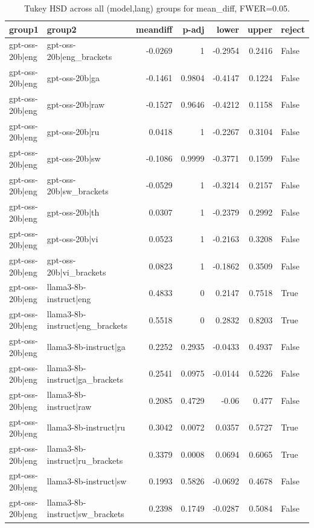 \begin{table}
\caption{Tukey HSD across all (model,lang) groups for mean_diff, FWER=0.05.}
\label{tab:tukey_all_models_all_langs_mean_diff}
\begin{tabular}{l l r r r r l}
\toprule
group1 & group2 & meandiff & p-adj & lower & upper & reject \\
\midrule
gpt-oss-20b|eng & gpt-oss-20b|eng_brackets & -0.0269 & 1 & -0.2954 & 0.2416 & False \\
gpt-oss-20b|eng & gpt-oss-20b|ga & -0.1461 & 0.9804 & -0.4147 & 0.1224 & False \\
gpt-oss-20b|eng & gpt-oss-20b|raw & -0.1527 & 0.9646 & -0.4212 & 0.1158 & False \\
gpt-oss-20b|eng & gpt-oss-20b|ru & 0.0418 & 1 & -0.2267 & 0.3104 & False \\
gpt-oss-20b|eng & gpt-oss-20b|sw & -0.1086 & 0.9999 & -0.3771 & 0.1599 & False \\
gpt-oss-20b|eng & gpt-oss-20b|sw_brackets & -0.0529 & 1 & -0.3214 & 0.2157 & False \\
gpt-oss-20b|eng & gpt-oss-20b|th & 0.0307 & 1 & -0.2379 & 0.2992 & False \\
gpt-oss-20b|eng & gpt-oss-20b|vi & 0.0523 & 1 & -0.2163 & 0.3208 & False \\
gpt-oss-20b|eng & gpt-oss-20b|vi_brackets & 0.0823 & 1 & -0.1862 & 0.3509 & False \\
gpt-oss-20b|eng & llama3-8b-instruct|eng & 0.4833 & 0 & 0.2147 & 0.7518 & True \\
gpt-oss-20b|eng & llama3-8b-instruct|eng_brackets & 0.5518 & 0 & 0.2832 & 0.8203 & True \\
gpt-oss-20b|eng & llama3-8b-instruct|ga & 0.2252 & 0.2935 & -0.0433 & 0.4937 & False \\
gpt-oss-20b|eng & llama3-8b-instruct|ga_brackets & 0.2541 & 0.0975 & -0.0144 & 0.5226 & False \\
gpt-oss-20b|eng & llama3-8b-instruct|raw & 0.2085 & 0.4729 & -0.06 & 0.477 & False \\
gpt-oss-20b|eng & llama3-8b-instruct|ru & 0.3042 & 0.0072 & 0.0357 & 0.5727 & True \\
gpt-oss-20b|eng & llama3-8b-instruct|ru_brackets & 0.3379 & 0.0008 & 0.0694 & 0.6065 & True \\
gpt-oss-20b|eng & llama3-8b-instruct|sw & 0.1993 & 0.5826 & -0.0692 & 0.4678 & False \\
gpt-oss-20b|eng & llama3-8b-instruct|sw_brackets & 0.2398 & 0.1749 & -0.0287 & 0.5084 & False \\

\end{tabular}
\end{table}
